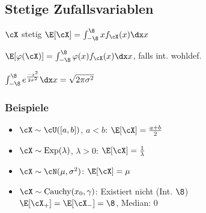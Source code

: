 \subsection{Stetige Zufallsvariablen}
\shortdefinition $\cX$ stetig $\E[\cX] = \int_{-\8}^{\8} x f_\cX(x) \dx x$

\shorttheorem $\E[\varphi(\cX)] = \int_{-\8}^{\8} \varphi(x) f_\cX(x) \dx x$, falls int. wohldef.

 $\int_{-\8}^{\8} e^{\frac{-x^2}{2\sigma^2}} \dx x = \sqrt{2 \pi \sigma^2}$

\subsubsection{Beispiele}
\begin{itemize}
    \item $\cX \sim \cU([a, b])$, $a < b$: $\E[\cX] = \frac{a + b}{2}$
    \item $\cX \sim \text{Exp}(\lambda)$, $\lambda > 0$: $\E[\cX] = \frac{1}{\lambda}$
    \item $\cX \sim \cN(\mu, \sigma^2)$: $\E[\cX] = \mu$
    \item $\cX \sim \text{Cauchy}(x_0, \gamma)$: Existiert nicht (Int. $\8$)\\
          $\E[\cX_+] = \E[\cX_-] = \8$, Median: $0$
\end{itemize}
